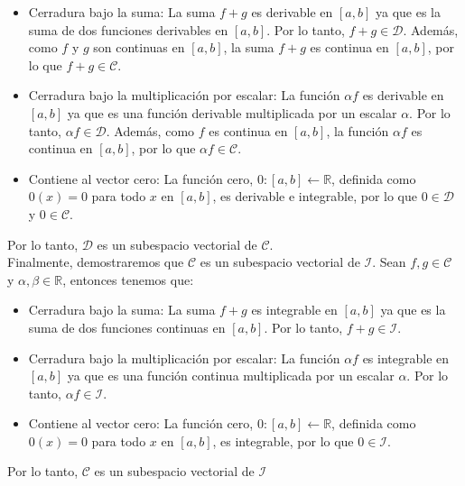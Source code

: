 \begin{itemize}
	\item Cerradura bajo la suma: La suma $f + g$ es derivable en $[a, b]$ ya que es la suma de dos funciones derivables en $[a, b]$. Por lo tanto, $f + g \in \mathcal{D}$. Además, como $f$ y $g$ son continuas en $[a, b]$, la suma $f + g$ es continua en $[a, b]$, por lo que $f + g \in \mathcal{C}$.
	\item Cerradura bajo la multiplicación por escalar: La función $\alpha f$ es derivable en $[a, b]$ ya que es una función derivable multiplicada por un escalar $\alpha$. Por lo tanto, $\alpha f  \in \mathcal{D}$. Además, como $f$ es continua en $[a, b]$, la función $\alpha f$ es continua en $[a, b]$, por lo que $\alpha f \in \mathcal{C}$.
	\item Contiene al vector cero: La función cero, $0: [a, b] \leftarrow \mathbb{R}$, definida como $0(x) = 0$ para todo $x$ en $[a, b]$, es derivable e integrable, por lo que $0 \in \mathcal{D}$ y $0 \in \mathcal{C}$.
\end{itemize}

Por lo tanto, $\mathcal{D}$ es un subespacio vectorial de $\mathcal{C}$.\\

Finalmente, demostraremos que $\mathcal{C}$ es un subespacio vectorial de $\mathcal{I}$. Sean $f, g \in \mathcal{C}$ y $\alpha, \beta \in \mathbb{R}$, entonces tenemos que:\\

\begin{itemize}
	\item Cerradura bajo la suma: La suma $f + g$ es integrable en $[a, b]$ ya que es la suma de dos funciones continuas en $[a, b]$. Por lo tanto, $f + g \in \mathcal{I}$.
	\item Cerradura bajo la multiplicación por escalar: La función $\alpha f$ es integrable en $[a, b]$ ya que es una función continua multiplicada por un escalar $\alpha$. Por lo tanto, $\alpha f \in \mathcal{I}$.
	\item Contiene al vector cero: La función cero, $0: [a, b] \leftarrow \mathbb{R}$, definida como $0(x) = 0$ para todo $x$ en $[a, b]$, es integrable, por lo que $0 \in \mathcal{I}$.
\end{itemize}

Por lo tanto, $\mathcal{C}$ es un subespacio vectorial de $\mathcal{I}$
